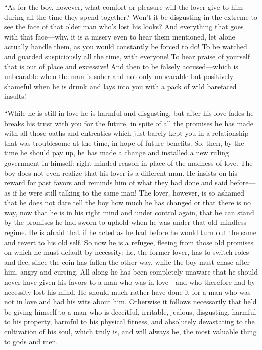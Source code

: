 “As for the boy, however, what comfort or pleasure will the lover give
to him during all the time they spend together? Won't it be disgusting
in the extreme to see the face of that older man who's lost his looks?
And everything that goes with that face---why, it is a misery even to
hear them mentioned, let alone actually handle them, as you would
constantly be forced to do! To be watched and guarded
suspiciously all the time, with everyone! To hear praise of yourself
that is out of place and excessive! And then to be falsely
accused---which is unbearable when the man is sober and not only
unbearable but positively shameful when he is drunk and lays into you
with a pack of wild barefaced insults!

“While he is still in love he is harmful and disgusting, but after his
love fades he breaks his trust with you for the future, in spite of all
the promises he has made with all those oaths and entreaties which just
barely kept you in a relationship that was troublesome
at the time, in hope of future benefits. So, then, by the time he should
pay up, he has made a change and installed a new ruling government in
himself: right-minded reason in place of the madness of love. The boy
does not even realize that his lover is a different man. He insists on
his reward for past favors and reminds him of what they had done and
said before---as if he were still talking to the same man! The lover,
however, is so ashamed that he does not dare tell the boy how much he
has changed or that there is no way, now that he is in his right mind
and under control again, that he can stand by the promises he had sworn
to uphold when he was under that old mindless regime. He is
afraid that if he acted as he had before he would turn out the same and
revert to his old self. So now he is a refugee, fleeing from those old
promises on which he must default by necessity; he, the former lover,
has to switch roles and flee, since the coin has fallen the other way,
while the boy must chase after him, angry and cursing. All along he has
been completely unaware that he should never have given his
favors to a man who was in love---and who therefore had by necessity
lost his mind. He should much rather have done it for a man who was not
in love and had his wits about him. Otherwise it follows necessarily
that he'd be giving himself to a man who is deceitful, irritable,
jealous, disgusting, harmful to his property, harmful to his physical
fitness, and absolutely devastating to the cultivation of his soul,
which truly is, and will always be, the most valuable thing to gods and
men.

